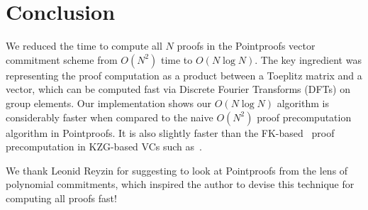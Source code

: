 \section{Conclusion}
We reduced the time to compute all $N$ proofs in the Pointproofs vector commitment scheme from $O(N^2)$ time to $O(N\log{N})$.
The key ingredient was representing the proof computation as a product between a Toeplitz matrix and a vector, which can be computed fast via Discrete Fourier Transforms (DFTs) on group elements.
Our implementation shows our $O(N\log{N})$ algorithm is considerably faster when compared to the naive $O(N^2)$ proof precomputation algorithm in Pointproofs.
It is also slightly faster than the FK-based~\cite{FK20} proof precomputation in KZG-based VCs such as~\cite{TAB+20}.

We thank Leonid Reyzin for suggesting to look at Pointproofs from the lens of polynomial commitments, which inspired the author to devise this technique for computing all proofs fast!